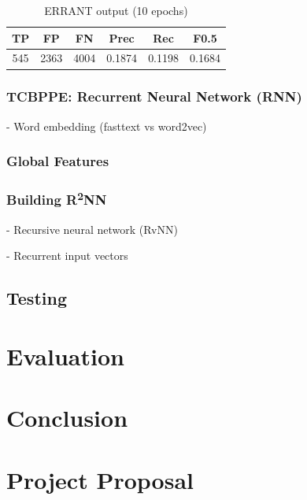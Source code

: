 \documentclass[12pt,a4paper,twoside,openright]{report}
\begin{document}
\begin{table}[h!]
\centering
\begin{tabular}{ |c|c|c|c|c|c| } 
 \hline
 TP & FP & FN & Prec & Rec & F0.5 \\ [0.5ex] 
 \hline
 545 & 2363 & 4004 & 0.1874 & 0.1198 & 0.1684 \\ 
 \hline
\end{tabular}
\caption{ERRANT output (10 epochs)}
\label{table:sparse_10}
\end{table}


\subsection{TCBPPE: Recurrent Neural Network (RNN)}

- Word embedding (fasttext vs word2vec)

\subsection{Global Features}

\subsection{Building \texorpdfstring{R\textsuperscript{2}NN}{R2NN}}
- Recursive neural network (RvNN)

- Recurrent input vectors

\section{Testing}

\chapter{Evaluation}

\chapter{Conclusion}




\appendix

\chapter{Project Proposal}
\end{document}
